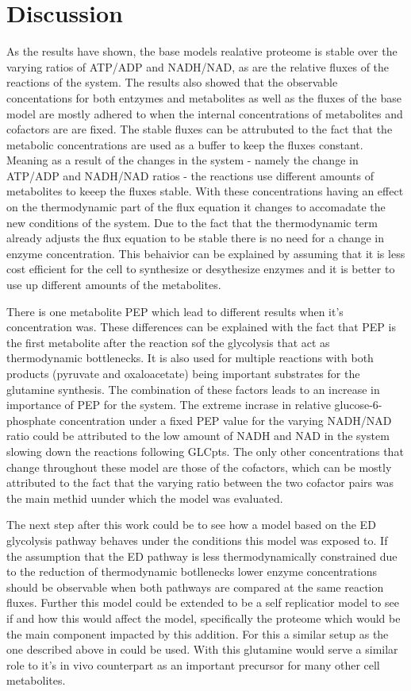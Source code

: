 \section{Discussion}
As the results have shown, the base models realative proteome is stable over the varying ratios of ATP/ADP and NADH/NAD, as are the relative fluxes of the reactions of the system. The results also showed that the observable concentations for both entzymes and metabolites as well as the fluxes of the base model are mostly adhered to when the internal concentrations of metabolites and cofactors are are fixed. 
The stable fluxes can be attrubuted to the fact that the metabolic concentrations are used as a buffer to keep the fluxes constant. Meaning as a result of the changes in the system - namely the change in ATP/ADP and NADH/NAD ratios - the reactions use different amounts of metabolites to keeep the fluxes stable. With these concentrations having an effect on the thermodynamic part of the flux equation it changes to accomadate the new conditions of the system. Due to the fact that the thermodynamic term already adjusts the flux equation to be stable there is no need for  a change in enzyme concentration.
This behaivior can be explained by assuming that it is less cost efficient for the cell to synthesize or desythesize enzymes and it is better to use up different amounts of the metabolites. 

There is one metabolite PEP which lead to different results when it's concentration was. These differences can be explained with the fact that PEP is the first metabolite after the reaction sof the glycolysis that act as thermodynamic bottlenecks. It is also used for multiple reactions with both products (pyruvate and oxaloacetate) being important substrates for the glutamine synthesis. The combination of these factors leads to an increase in importance of PEP for the system.
The extreme incrase in relative glucose-6-phosphate concentration under a fixed PEP value for the varying NADH/NAD ratio could be attributed to the low amount of NADH and NAD in the system slowing down the reactions following GLCpts.  
The only other concentrations that change throughout these model are those of the cofactors, which can be mostly attributed to the fact that the varying ratio between the two cofactor pairs was the main methid uunder which the model was evaluated.
 
The next step after this work could be to see how a model based on the ED glycolysis pathway behaves under the conditions this model was exposed to. If the assumption that the ED pathway is less thermodynamically constrained due to the reduction of thermodynamic botllenecks lower enzyme concentrations should be observable when both pathways are compared at the same reaction fluxes.
Further this model could be extended to be a self replicatior model to see if and how this would affect the model, specifically the proteome which would be the main component impacted by this addition. For this a similar setup as the one described above in could be used. With this glutamine would serve a similar role to it's in vivo counterpart as an important precursor for many other cell metabolites.
